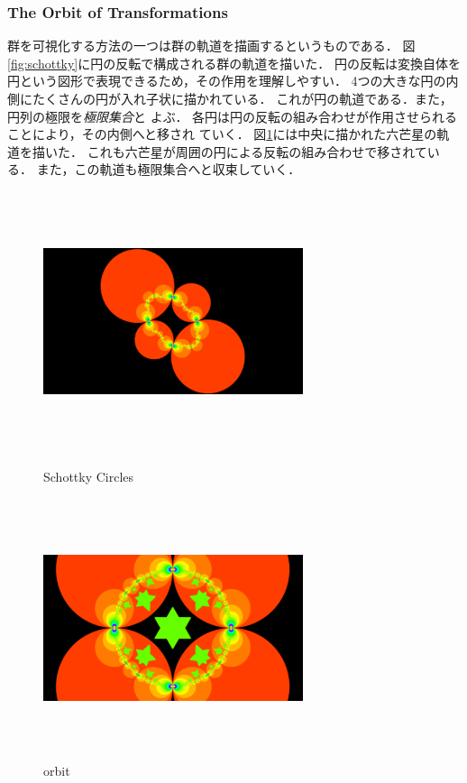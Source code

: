 \subsubsection{The Orbit of Transformations}

群を可視化する方法の一つは群の軌道を描画するというものである．
図\ref{fig:schottky}に円の反転で構成される群の軌道を描いた．
円の反転は変換自体を円という図形で表現できるため，その作用を理解しやすい．
4つの大きな円の内側にたくさんの円が入れ子状に描かれている．
これが円の軌道である．また，円列の極限を\emph{極限集合}と
よぶ．
各円は円の反転の組み合わせが作用させられることにより，その内側へと移され
ていく．
図\ref{fig:orbit}には中央に描かれた六芒星の軌道を描いた．
これも六芒星が周囲の円による反転の組み合わせで移されている．
また，この軌道も極限集合へと収束していく．
\begin{figure}[htbp]
 \begin{minipage}{0.49\hsize}
  \begin{center}
   \includegraphics[width=3in, height=3in, keepaspectratio]{../img/klein/schottkyCircles.pdf}
   \caption{Schottky Circles}
   \label{fig:schottky}
  \end{center}
 \end{minipage}
  \begin{minipage}{0.49\hsize}
  \begin{center}
   \includegraphics[width=3in, height=3in, keepaspectratio]{../img/klein/starOrbit.pdf}
   \caption{orbit}
   \label{fig:orbit}
  \end{center}
  \end{minipage}
\end{figure}

